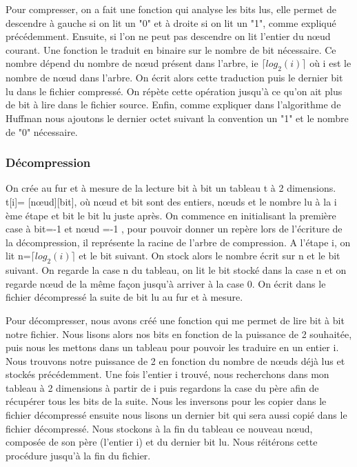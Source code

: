 \documentclass{report}
\begin{document}
Pour compresser, on a fait une fonction qui analyse les bits lus, elle permet de descendre à gauche si on lit un "0" et à droite si on lit un "1", comme expliqué précédemment. Ensuite, si l'on ne peut pas descendre on lit l'entier du nœud courant. Une fonction le traduit en binaire sur le nombre de bit nécessaire. Ce nombre dépend du nombre de nœud présent dans l'arbre, ie $\lceil log_{2}(i) \rceil$ où i est le nombre de nœud dans l'arbre. 
On écrit alors cette traduction puis le dernier bit lu dans le fichier compressé. On répète cette opération jusqu'à ce qu'on ait plus de bit  à lire dans le fichier source.
Enfin, comme expliquer dans l'algorithme de Huffman nous ajoutons le dernier octet suivant la convention un "1" et le nombre de "0" nécessaire.  

\subsubsection{Décompression}
On crée au fur et à mesure de la lecture bit à bit un tableau t à 2 dimensions.  t[i]= [nœud][bit], où nœud et bit sont des entiers, nœuds et le nombre lu à la i ème étape et bit le bit lu juste après. 
On commence en initialisant la première case à  bit=-1 et nœud =-1 , pour pouvoir donner un repère lors de l'écriture de la décompression, il représente la racine de l'arbre de compression.  
A l'étape i, on lit n=$\lceil log_{2}(i) \rceil$ et le bit suivant. On stock alors le nombre écrit sur n et le bit suivant. On regarde la case n du tableau, on lit le bit stocké dans la case n et on regarde nœud de la même façon jusqu'à arriver à la case 0. On écrit dans le fichier décompressé la suite de bit lu au fur et à mesure.

Pour décompresser, nous avons créé une fonction qui me permet de lire bit à bit notre fichier. Nous lisons alors nos bits en fonction de la puissance de 2 souhaitée, puis nous les mettons dans un tableau pour pouvoir les traduire en un entier i. 
Nous trouvons notre puissance de 2 en fonction du nombre de nœuds déjà lus et stockés précédemment.
Une fois l'entier i  trouvé, nous recherchons dans mon tableau à 2 dimensions à partir de i puis regardons la case du père afin de récupérer tous les bits de la suite. Nous les inversons pour les copier dans le fichier décompressé ensuite nous lisons un dernier bit qui sera aussi copié dans le fichier décompressé.
Nous stockons à la fin du tableau ce nouveau nœud, composée de son père (l'entier i) et du dernier bit lu. 
Nous réitérons cette procédure jusqu'à la fin du fichier. 
\end{document}
